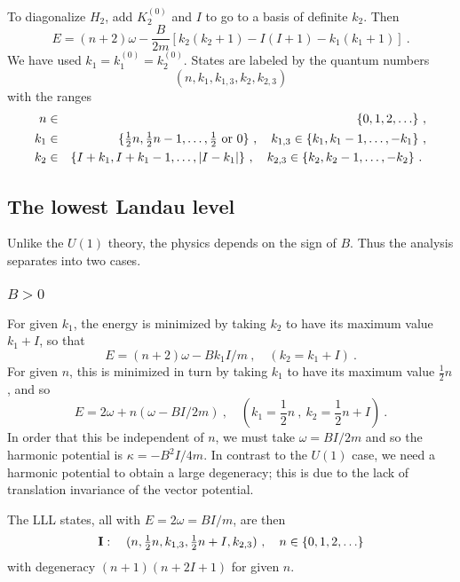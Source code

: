 \documentclass[a4paper,12pt]{article}
\newcommand{\half}{{\textstyle \frac{1}{2}}}
\begin{document}
To diagonalize $H_2$, add $K_2^{(0)}$ and $I$ to go to a basis of
definite
$k_2$.  Then
\begin{equation}
E =  (n+2)\omega - \frac{B}{2m} [k_2 (k_2+1) - I (I+1) - k_1 (k_1 + 1)
]\ .
\end{equation}
We have used $k_1 = k_1^{(0)} = k_2^{(0)}$.
States are labeled by the quantum numbers 
\begin{equation}
(n, k_1, k_{1,3}, k_2,
k_{2,3}) \label{basis}
\end{equation}
with the ranges
\begin{eqnarray}
n &\in& \{ 0,1,2,\ldots \}\ ,\nonumber\\
k_1 &\in& \{ \half{n}, \half{n}-1,\ldots,  \half\ {\rm
or}\ 0 \}\ ,\quad
k_{1,3} \in \{ k_1, k_1-1,\ldots, -k_1 \}\ ,\nonumber\\
k_2 &\in& \{ I + k_1, I + k_1-1,\ldots,  |I - k_1 |\}\ ,\quad
k_{2,3} \in \{ k_2, k_2-1,\ldots, -k_2 \}\ .
\
\end{eqnarray}

\subsection{The lowest Landau level}

Unlike the $U(1)$ theory, the physics depends on the sign of $B$.  Thus the
analysis separates into two cases.

\subsubsection{$B > 0$}

For given $k_1$, the energy is minimized by taking $k_2$ to have its
maximum value $k_1 + I$, so that
\begin{equation}
E =  (n+2)\omega - {B} k_1 I/m\ ,\quad (k_2 = k_1 + I)\ .
\end{equation}
For given $n$, this is minimized in turn by taking $k_1$ to have its
maximum value $\half n$, and so
\begin{equation}
E =  2\omega + n (\omega - {BI}/{2m}) \ ,\quad (k_1 = \half n\ ,\ k_2 =
\half n + I)\ .
\end{equation}
In order that this be independent of $n$, we must take $\omega = 
{BI}/{2m}$ and so the harmonic potential is $\kappa = - B^2 I/4m$.  In
contrast to the $U(1)$ case, we need a harmonic potential to obtain a
large degeneracy; this is due to the lack of translation invariance of the
vector potential.

The LLL states, all with $E = 2\omega = BI/m$, are then
\begin{equation}
{\bf I}:\quad (n, \half n, k_{1,3}, \half n + I, k_{2,3})\ ,\quad
n \in \{0,1,2,\ldots\}
\label{lll1}
\end{equation}
with degeneracy $(n+1) (n+2I+1)$ for given $n$.
\end{document}
